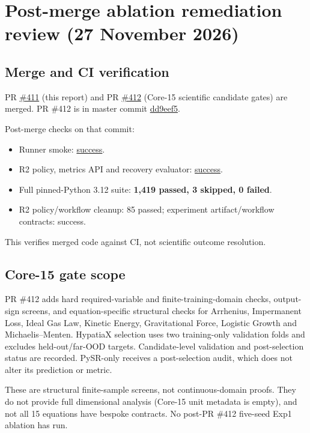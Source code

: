 \documentclass[11pt,a4paper]{article}
\begin{document}
\section{Post-merge ablation remediation review (27 November 2026)}
\subsection{Merge and CI verification}
PR \href{https://github.com/sednabcn/LLM-HypatiaX-REPRO/pull/411}{\#411} (this report) and PR \href{https://github.com/sednabcn/LLM-HypatiaX-REPRO/pull/412}{\#412} (Core-15 scientific candidate gates) are merged. PR \#412 is in master commit \href{https://github.com/sednabcn/LLM-HypatiaX-REPRO/commit/dd9eef58fb4a666ed0ffb3632b27562d3567e74d}{dd9eef5}.

Post-merge checks on that commit:
\begin{itemize}
\item Runner smoke: \href{https://github.com/sednabcn/LLM-HypatiaX-REPRO/actions/runs/45982952869}{success}.
\item R2 policy, metrics API and recovery evaluator: \href{https://github.com/sednabcn/LLM-HypatiaX-REPRO/actions/runs/45982953065}{success}.
\item Full pinned-Python 3.12 suite: \textbf{1,419 passed, 3 skipped, 0 failed}.
\item R2 policy/workflow cleanup: 85 passed; experiment artifact/workflow contracts: success.
\end{itemize}
This verifies merged code against CI, not scientific outcome resolution.

\subsection{Core-15 gate scope}
PR \#412 adds hard required-variable and finite-training-domain checks, output-sign screens, and equation-specific structural checks for Arrhenius, Impermanent Loss, Ideal Gas Law, Kinetic Energy, Gravitational Force, Logistic Growth and Michaelis--Menten. HypatiaX selection uses two training-only validation folds and excludes held-out/far-OOD targets. Candidate-level validation and post-selection status are recorded. PySR-only receives a post-selection audit, which does not alter its prediction or metric.

These are structural finite-sample screens, not continuous-domain proofs. They do not provide full dimensional analysis (Core-15 unit metadata is empty), and not all 15 equations have bespoke contracts. No post-PR \#412 five-seed Exp1 ablation has run.
\end{document}
